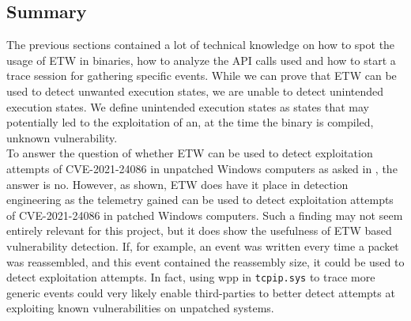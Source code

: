 \documentclass{report}
\begin{document}
\subsection{Summary}
The previous sections contained a lot of technical knowledge on how to spot the usage of \gls{ETW} in binaries, how to analyze the API calls used and how to start a trace session for gathering specific events. While we can prove that \gls{ETW} can be used to detect unwanted execution states, we are unable to detect unintended execution states. We define unintended execution states as states that may potentially led to the exploitation of an, at the time the binary is compiled, unknown vulnerability.
\\
To answer the question of whether \gls{ETW} can be used to detect exploitation attempts of CVE-2021-24086 in unpatched Windows computers as asked in , the answer is no. However, as shown, \gls{ETW} does have it place in detection engineering as the telemetry gained can be used to detect exploitation attempts of CVE-2021-24086 in patched Windows computers. Such a finding may not seem entirely relevant for this project, but it does show the usefulness of \gls{ETW} based vulnerability detection. If, for example, an event was written every time a packet was reassembled, and this event contained the reassembly size, it could be used to detect exploitation attempts. In fact, using \gls{wpp} in \texttt{tcpip.sys} to trace more generic events could very likely enable third-parties to better detect attempts at exploiting known vulnerabilities on unpatched systems.
\end{document}
